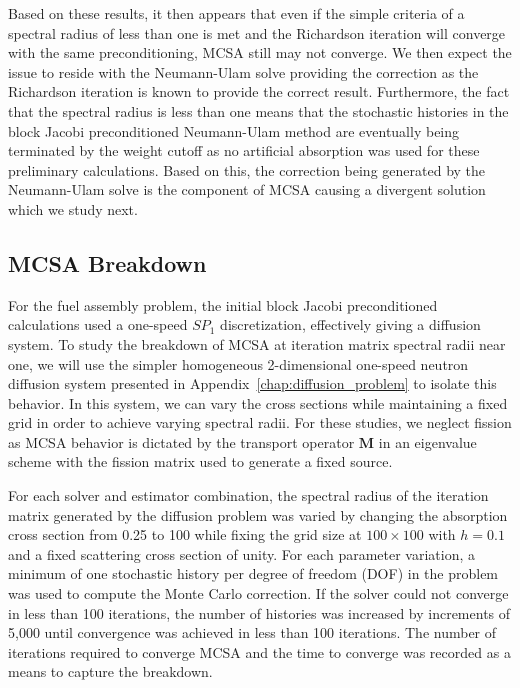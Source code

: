 Based on these results, it then appears that even if the simple
criteria of a spectral radius of less than one is met and the
Richardson iteration will converge with the same preconditioning, MCSA
still may not converge. We then expect the issue to reside with the
Neumann-Ulam solve providing the correction as the Richardson
iteration is known to provide the correct result. Furthermore, the
fact that the spectral radius is less than one means that the
stochastic histories in the block Jacobi preconditioned Neumann-Ulam
method are eventually being terminated by the weight cutoff as no
artificial absorption was used for these preliminary
calculations. Based on this, the correction being generated by the
Neumann-Ulam solve is the component of MCSA causing a divergent
solution which we study next.

\subsection{MCSA Breakdown}
\label{subsec:mcsa_break_down}
For the fuel assembly problem, the initial block Jacobi preconditioned
calculations used a one-speed $SP_1$ discretization, effectively
giving a diffusion system. To study the breakdown of MCSA at iteration
matrix spectral radii near one, we will use the simpler homogeneous
2-dimensional one-speed neutron diffusion system presented in
Appendix~\ref{chap:diffusion_problem} to isolate this behavior. In
this system, we can vary the cross sections while maintaining a fixed
grid in order to achieve varying spectral radii. For these studies, we
neglect fission as MCSA behavior is dictated by the transport operator
$\mathbf{M}$ in an eigenvalue scheme with the fission matrix used to
generate a fixed source.

For each solver and estimator combination, the spectral radius of the
iteration matrix generated by the diffusion problem was varied by
changing the absorption cross section from 0.25 to 100 while fixing
the grid size at $100 \times 100$ with $h = 0.1$ and a fixed
scattering cross section of unity. For each parameter variation, a
minimum of one stochastic history per degree of freedom (DOF) in the
problem was used to compute the Monte Carlo correction. If the solver
could not converge in less than 100 iterations, the number of
histories was increased by increments of 5,000 until convergence was
achieved in less than 100 iterations. The number of iterations
required to converge MCSA and the time to converge was recorded as a
means to capture the breakdown.

